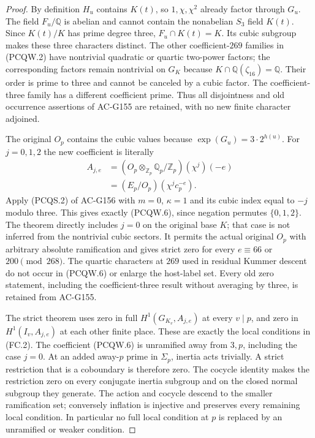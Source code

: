 \begin{proof}
By definition $H_u$ contains $K(t)$, so $1,\chi,\chi^2$
already factor through $G_u$.
The field $F_u/\mathbb Q$ is abelian and cannot contain the
nonabelian $S_3$ field $K(t)$.
Since $K(t)/K$ has prime degree three, $F_u\cap K(t)=K$.
Its cubic subgroup makes these three characters distinct.
The other coefficient-$269$ families in (PCQW.2) have nontrivial
quadratic or quartic two-power factors; the corresponding factors
remain nontrivial on $G_K$ because $K\cap\mathbb Q(\zeta_{16})
=\mathbb Q$.  Their order is prime to three and cannot be
canceled by a cubic factor.
The coefficient-three family has a different coefficient prime.
Thus all disjointness and old occurrence assertions of AC-G155
are retained, with no new finite character adjoined.

The original $O_p$ contains the cubic values because
$\exp(G_u)=3\cdot2^{h(u)}$.
For $j=0,1,2$ the new coefficient is literally
\[
 \begin{aligned}
 A_{j,e}&=(O_p\otimes_{\mathbb Z_p}\mathbb Q_p/\mathbb Z_p)
                                                  (\chi^j)(-e)\\
        &=(E_p/O_p)(\chi^jc_p^{-e}).
 \end{aligned}
 \tag{PCQW.6}
\]
Apply (PCQS.2) of AC-G156 with $m=0$, $\kappa=1$ and
its cubic index equal to $-j$ modulo three.  This gives exactly
(PCQW.6), since negation permutes $\{0,1,2\}$.
The theorem directly includes $j=0$ on the original base $K$;
that case is not inferred from the nontrivial cubic sectors.
It permits the actual original $O_p$ with arbitrary absolute
ramification and gives strict zero for every
$e\equiv66$ or $200\pmod{268}$.
The quartic characters at $269$ used in residual Kummer descent
do not occur in (PCQW.6) or enlarge the host-label set.
Every old zero statement, including the coefficient-three result
without averaging by three, is retained from AC-G155.

The strict theorem uses zero in full
$H^1(G_{K_v},A_{j,e})$ at every $v\mid p$, and zero in
$H^1(I_v,A_{j,e})$ at each other finite place.
These are exactly the local conditions in (FC.2).
The coefficient (PCQW.6) is unramified away from $3,p$,
including the case $j=0$.
At an added away-$p$ prime in $\Sigma_p$, inertia acts trivially.
A strict restriction that is a coboundary is therefore zero.
The cocycle identity makes the restriction zero on every conjugate
inertia subgroup and on the closed normal subgroup they generate.
The action and cocycle descend to the smaller ramification set;
conversely inflation is injective and preserves every remaining
local condition.  In particular no full local condition at $p$
is replaced by an unramified or weaker condition.


\end{proof}
